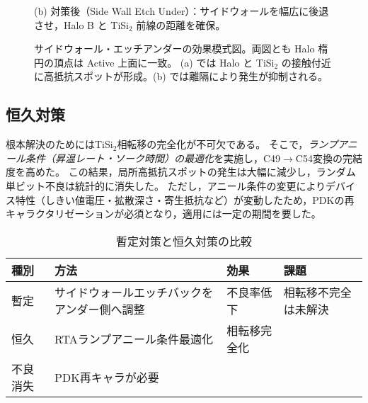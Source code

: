 \documentclass[conference]{IEEEtran}
\begin{document}
\begin{figure}[!t]

\footnotesize (b) 対策後（Side Wall Etch Under）：サイドウォールを幅広に後退させ，Halo B と TiSi$_2$ 前線の距離を確保。
\normalsize

\caption{サイドウォール・エッチアンダーの効果模式図。両図とも Halo 楕円の頂点は Active 上面に一致。
(a) では Halo と TiSi$_2$ の接触付近に高抵抗スポットが形成。(b) では離隔により発生が抑制される。}
\label{fig:sidewall_schematic}
\end{figure}

\subsection{恒久対策}
根本解決のためにはTiSi$_2$相転移の完全化が不可欠である。  
そこで，\emph{ランプアニール条件（昇温レート・ソーク時間）の最適化}を実施し，C49$\to$C54変換の完結度を高めた。  
この結果，局所高抵抗スポットの発生は大幅に減少し，ランダム単ビット不良は統計的に消失した。  
ただし，アニール条件の変更によりデバイス特性（しきい値電圧・拡散深さ・寄生抵抗など）が変動したため，PDKの再キャラクタリゼーションが必須となり，適用には一定の期間を要した。  

\begin{table}[!t]
\centering
\caption{暫定対策と恒久対策の比較}
\label{tab:countermeasures}
\begin{tabularx}{\columnwidth}{l X X X}
\toprule
種別 & 方法 & 効果 & 課題 \\
\midrule
暫定 & サイドウォールエッチバックをアンダー側へ調整
     & 不良率低下
     & 相転移不完全は未解決 \\

恒久 & RTAランプアニール条件最適化
     & 相転移完全化 \\ 不良消失
     & PDK再キャラが必要 \\
\bottomrule
\end{tabularx}
\end{table}
\end{document}
